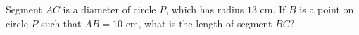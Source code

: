 Segment $AC$ is a diameter of circle $P$, which has radius $13$ cm. If $B$ is a point on circle $P$ such that $AB=10$ cm, what is the length of segment $BC$?
